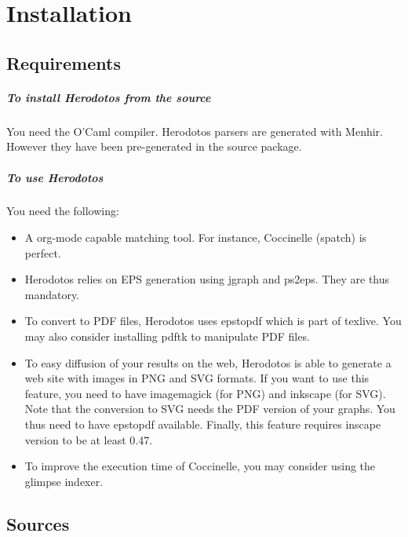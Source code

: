 
\chapter{Installation}
\label{sec:install}

\section{Requirements}
\label{sec:requirements}

\paragraph{To install Herodotos from the source}

You need the O'Caml compiler. Herodotos parsers are generated with
Menhir. However they have been pre-generated in the source package.

\paragraph{To use Herodotos}

You need the following:

\begin{itemize}
\item A org-mode capable matching tool. For instance, Coccinelle
  (spatch) is perfect.

\item Herodotos relies on EPS generation using jgraph and ps2eps. They
  are thus mandatory.
\item To convert to PDF files, Herodotos uses epstopdf which is part
  of texlive. You may also consider installing pdftk to manipulate
  PDF files.
\item To easy diffusion of your results on the web, Herodotos is able
  to generate a web site with images in PNG and SVG formats. If you
  want to use this feature, you need to have imagemagick (for PNG) and
  inkscape (for SVG). Note that the conversion to SVG needs the PDF
  version of your graphs. You thus need to have epstopdf
  available. Finally, this feature requires inscape version to be at
  least 0.47.
\item To improve the execution time of Coccinelle, you may consider
  using the glimpse indexer.
\end{itemize}

\section{Sources}
\label{sec:sources}

